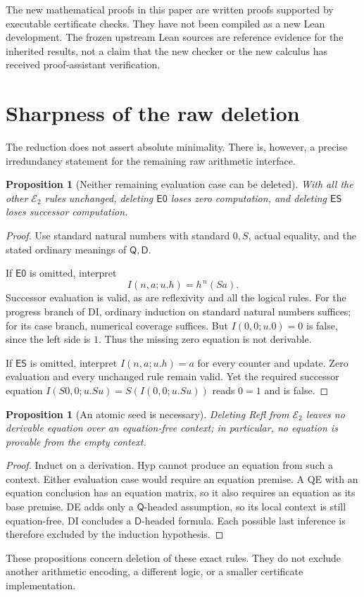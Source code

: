 \documentclass[11pt]{article}
\newtheorem{proposition}[theorem]{Proposition}
\theoremstyle{definition}\newtheorem{definition}[theorem]{Definition}
\newcommand{\Rtwo}{\mathcal E_2}
\newcommand{\Q}{\mathsf Q}
\newcommand{\D}{\mathsf D}
\newcommand{\evz}{\mathsf{E0}}
\newcommand{\evs}{\mathsf{ES}}
\begin{document}
The new mathematical proofs in this paper are written proofs supported
by executable certificate checks. They have not been compiled as a new
Lean development. The frozen upstream Lean sources are reference
evidence for the inherited results, not a claim that the new checker
or the new calculus has received proof-assistant verification.

\section{Sharpness of the raw deletion}

The reduction does not assert absolute minimality. There is, however,
a precise irredundancy statement for the remaining raw arithmetic
interface.

\begin{proposition}[Neither remaining evaluation case can be deleted]
With all the other $\Rtwo$ rules unchanged, deleting $\evz$ loses
zero computation, and deleting $\evs$ loses successor computation.
\end{proposition}
\begin{proof}
Use standard natural numbers with standard $0,S$, actual equality,
and the stated ordinary meanings of $\Q,\D$.

If $\evz$ is omitted, interpret
\[
 I(n,a;u.h)=h^{\,n}(Sa).
\]
Successor evaluation is valid, as are reflexivity and all the logical
rules. For the progress branch of DI, ordinary induction on standard
natural numbers suffices; for its case branch, numerical coverage
suffices. But $I(0,0;u.0)=0$ is false, since the left side is $1$.
Thus the missing zero equation is not derivable.

If $\evs$ is omitted, interpret $I(n,a;u.h)=a$ for every counter and
update. Zero evaluation and every unchanged rule remain valid. Yet the
required successor equation
$I(S0,0;u.Su)=S(I(0,0;u.Su))$ reads $0=1$ and is false.
\end{proof}

\begin{proposition}[An atomic seed is necessary]
Deleting Refl from $\Rtwo$ leaves no derivable equation over an
equation-free context; in particular, no equation is provable from the
empty context.
\end{proposition}
\begin{proof}
Induct on a derivation. Hyp cannot produce an equation from such a
context. Either evaluation case would require an equation premise.
A QE with an equation conclusion has an equation matrix, so it also
requires an equation as its base premise. DE adds only a $\Q$-headed
assumption, so its local context is still equation-free. DI concludes
a $\D$-headed formula. Each possible last inference is therefore
excluded by the induction hypothesis.
\end{proof}
These propositions concern deletion of these exact rules. They do not
exclude another arithmetic encoding, a different logic, or a smaller
certificate implementation.
\end{document}
